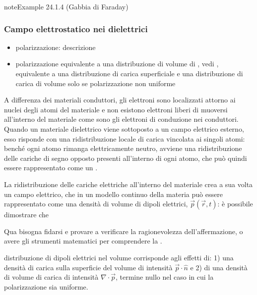 \documentclass[letterpaper,10pt,italian]{jupyterBook}
\begin{document}
\label{ch/electromagnetism/electrostatics:faraday-cage}
\begin{sphinxadmonition}{note}{Example 24.1.4 (Gabbia di Faraday)}


\end{sphinxadmonition}


\subsubsection{Campo elettrostatico nei dielettrici}
\label{\detokenize{ch/electromagnetism/electrostatics:campo-elettrostatico-nei-dielettrici}}\label{\detokenize{ch/electromagnetism/electrostatics:physics-hs-electromagnetism-electrostatics-e-field-media-dielectrics}}\begin{itemize}
\item {} 
\sphinxAtStartPar
polarizzazione: descrizione

\item {} 
\sphinxAtStartPar
polarizzazione equivalente a una distribuzione di volume di , vedi {\hyperref[\detokenize{ch/electromagnetism/electrostatics:electric-dipole}]{}}, equivalente a una distribuzione di carica superficiale e una distribuzione di carica di volume solo se polarizzazione non uniforme

\end{itemize}

\sphinxAtStartPar
A differenza dei materiali conduttori, gli elettroni sono localizzati attorno ai nuclei degli atomi del materiale e non esistono elettroni liberi di muoversi all’interno del materiale \sphinxhyphen{} come sono gli elettroni di conduzione nei conduttori. Quando un materiale dielettrico viene sottoposto a un campo elettrico esterno, esso risponde con una ridistribuzione locale di carica vincolata ai singoli atomi: benché ogni atomo rimanga elettricamente neutro, avviene una ridistribuzione delle cariche di segno opposto presenti all’interno di ogni atomo, che può quindi essere rappresentato come un .

\sphinxAtStartPar
La ridistribuzione delle cariche elettriche all’interno del materiale crea a sua volta un campo elettrico, che in un modello continuo della materia può essere rappresentato come una densità di volume di dipoli elettrici, \(\vec{p}(\vec{r},t)\): è possibile dimostrare che%
\begin{footnote}[1]\sphinxAtStartFootnote
Qua bisogna fidarsi e provare a verificare la ragionevolezza dell’affermazione, o avere gli strumenti matematici per comprendere la .
%
\end{footnote} distribuzione di dipoli elettrici nel volume corrisponde agli effetti di: 1) una densità di carica sulla superficie del volume di intensità \(\vec{p} \cdot \hat{n}\) e 2) di una densità di volume di carica di intensità \(\nabla \cdot \vec{p}\), termine nullo nel caso in cui la polarizzazione sia uniforme.
\end{document}
